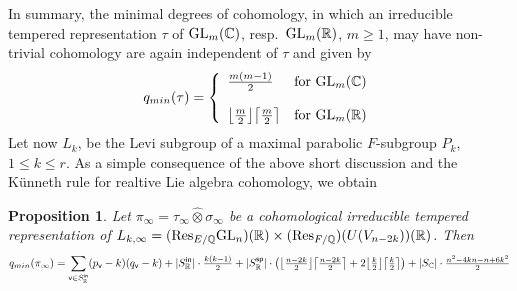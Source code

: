 \documentclass[a4paper,10pt]{amsart}
\newtheorem{prop}[equation]{Proposition}
\theoremstyle{definition}
\numberwithin{equation}{section}
\def\R{\mathbb R}
\def\Q{\mathbb Q}
\def\C{\mathbb C}
\def\Res{{\rm Res}}
\def\GL{{\rm GL}}
\def\vv{{\sf v}} %
\begin{document}
In summary, the minimal degrees of cohomology, in which an irreducible tempered representation $\tau$ of $\GL_m(\C)$, resp.\ $\GL_m(\R)$, $m\geq 1$, may have non-trivial cohomology are again independent of $\tau$ and given by
$$q_{min}(\tau)=\left\{\begin{array}{ll}
 \tfrac{m(m-1)}{2} & \textrm{for $\GL_m(\C)$} \\\\
 \big\lfloor\tfrac{m}{2}\big\rfloor\big\lceil\tfrac{m}{2}\big\rceil & \textrm{for $\GL_m(\R)$} 
\end{array}
\right.$$ 
Let now $L_k$, be the Levi subgroup of a maximal parabolic $F$-subgroup $P_k$, $1\leq k\leq r$. As a simple consequence of the above short discussion and the K\"unneth rule for realtive Lie algebra cohomology, we obtain

\begin{prop}\label{prop:qminLk}
Let $\pi_\infty=\tau_\infty\hat\otimes\sigma_\infty$ be a cohomological irreducible tempered representation of $L_{k,\infty}=(\Res_{E/\Q}\GL_n)(\R)\times (\Res_{F/\Q})(U(V_{n-2k}))(\R)$. Then
$$q_{min}(\pi_\infty)=\sum_{\vv\in S^{\sf in}_\R}(p_\vv-k)(q_\vv-k) + |S^{\sf in}_\R| \cdot\tfrac{k(k-1)}{2}+ |S^{\sf sp}_\R| \cdot\left(\big\lfloor\tfrac{n-2k}{2}\big\rfloor\big\lceil\tfrac{n-2k}{2}\big\rceil+2\big\lfloor\tfrac{k}{2}\big\rfloor\big\lceil\tfrac{k}{2}\big\rceil\right) + |S_\C| \cdot\tfrac{n^2-4kn-n+6k^2}{2}$$
\end{prop}
\end{document}

